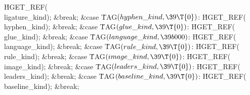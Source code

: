 \.{HGET\_REF}(\\{ligature\_kind});\5
\&{break};\6
\4\&{case} \.{TAG}${}(\index{hyphen kind+\\{hyphen\_kind}}\\{hyphen\_kind},\39\T{0}){}$:\5
\.{HGET\_REF}(\\{hyphen\_kind});\5
\&{break};\6
\4\&{case} \.{TAG}${}(\index{glue kind+\\{glue\_kind}}\\{glue\_kind},\39\T{0}){}$:\5
\.{HGET\_REF}(\\{glue\_kind});\5
\&{break};\6
\4\&{case} \.{TAG}${}(\index{language kind+\\{language\_kind}}\\{language\_kind},\39\\{b000}){}$:\5
\.{HGET\_REF}(\\{language\_kind});\5
\&{break};\6
\4\&{case} \.{TAG}${}(\index{rule kind+\\{rule\_kind}}\\{rule\_kind},\39\T{0}){}$:\5
\.{HGET\_REF}(\\{rule\_kind});\5
\&{break};\6
\4\&{case} \.{TAG}${}(\index{image kind+\\{image\_kind}}\\{image\_kind},\39\T{0}){}$:\5
\.{HGET\_REF}(\\{image\_kind});\5
\&{break};\6
\4\&{case} \.{TAG}${}(\index{leaders kind+\\{leaders\_kind}}\\{leaders\_kind},\39\T{0}){}$:\5
\.{HGET\_REF}(\\{leaders\_kind});\5
\&{break};\6
\4\&{case} \.{TAG}${}(\index{baseline kind+\\{baseline\_kind}}\\{baseline\_kind},\39\T{0}){}$:\5
\.{HGET\_REF}(\\{baseline\_kind});\5
\&{break};
\Y
\fi

